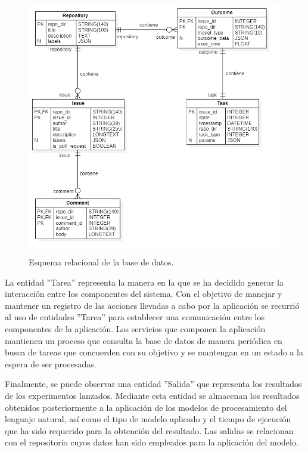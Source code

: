 \begin{figure}[!ht]
	\centering
\includegraphics[width=\textwidth]{img/er_diagram.png}
	\caption{Esquema relacional de la base de datos.}
	\label{fig:er_diagram}
\end{figure}

La entidad ''Tarea'' representa la manera en la que se ha decidido generar la interacción entre los componentes del sistema. Con el objetivo de manejar y mantener un registro de las acciones llevadas a cabo por la aplicación se recurrió al uso de entidades ''Tarea'' para establecer una comunicación entre los componentes de la aplicación. Los servicios que componen la aplicación mantienen un proceso que consulta la base de datos de manera periódica en busca de tareas que concuerden con su objetivo y se mantengan en un estado a la espera de ser procesadas.

Finalmente, se puede observar una entidad ''Salida'' que representa los resultados de los experimentos lanzados. Mediante esta entidad se almacenan los resultados obtenidos posteriormente a la aplicación de los modelos de procesamiento del lenguaje natural, así como el tipo de modelo aplicado y el tiempo de ejecución que ha sido requerido para la obtención del resultado. Las salidas se relacionan con el repositorio cuyos datos han sido empleados para la aplicación del modelo.

